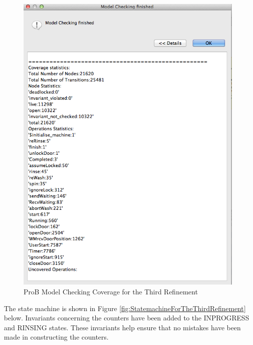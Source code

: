 \begin{figure}[!htbp]
  \includegraphics[width=1\textwidth]{figures/image39.png}
  \fi
  \caption{ProB Model Checking Coverage for the Third Refinement}
  \label{fig:ProBModelCheckingCoverageForTheThirdRefinement}
\end{figure} 
 
The state machine is shown in Figure \ref{fig:StatemachineForTheThirdRefinement} below. Invariants concerning the counters have been added to the INPROGRESS and RINSING states. These invariants help ensure that no mistakes have been made in constructing the counters.
 
